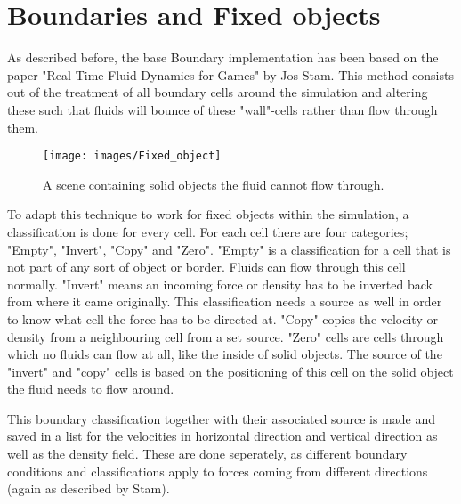 \chapter{Boundaries and Fixed objects}

As described before, the base Boundary implementation has been based on the paper "Real-Time Fluid Dynamics for Games" by Jos Stam. This method consists out of the treatment of all boundary cells around the simulation and altering these such that fluids will bounce of these "wall"-cells rather than flow through them. 



\begin{figure}[htb!]
    \centering
    \texttt{[image: images/Fixed\_object]}
    \caption{A scene containing solid objects the fluid cannot flow through.}
    \label{fig:Fixed_object}
\end{figure}

To adapt this technique to work for fixed objects within the simulation, a classification is done for every cell. For each cell there are four categories; "Empty", "Invert", "Copy" and "Zero". "Empty" is a classification for a cell that is not part of any sort of object or border. Fluids can flow through this cell normally. "Invert" means an incoming force or density has to be inverted back from where it came originally. This classification needs a source as well in order to know what cell the force has to be directed at. "Copy" copies the velocity or density from a neighbouring cell from a set source. "Zero" cells are cells through which no fluids can flow at all, like the inside of solid objects. The source of the "invert" and "copy" cells is based on the positioning of this cell on the solid object the fluid needs to flow around.

This boundary classification together with their associated source is made and saved in a list for the velocities in horizontal direction and vertical direction as well as the density field. These are done seperately, as different boundary conditions and classifications apply to forces coming from different directions (again as described by Stam). 

